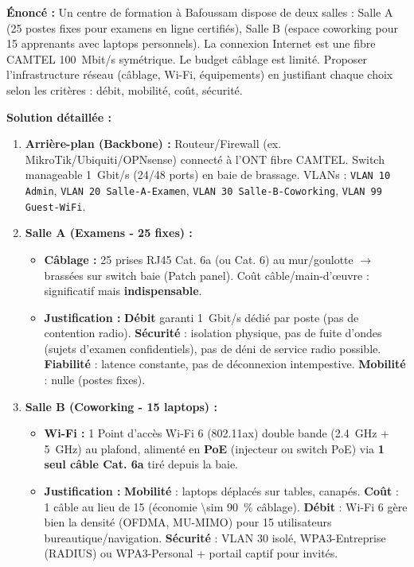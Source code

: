 \documentclass[11pt]{article}
\begin{document}
\begin{exoresolu}
\textbf{Énoncé :} Un centre de formation à Bafoussam dispose de deux salles : Salle A (25 postes fixes pour examens en ligne certifiés), Salle B (espace coworking pour 15 apprenants avec laptops personnels). La connexion Internet est une fibre CAMTEL \SI{100}{Mbit/s} symétrique. Le budget câblage est limité. Proposer l'infrastructure réseau (câblage, Wi-Fi, équipements) en justifiant chaque choix selon les critères : débit, mobilité, coût, sécurité.

\textbf{Solution détaillée :}

\begin{enumerate}
    \item \textbf{Arrière-plan (Backbone) :} Routeur/Firewall (ex. MikroTik/Ubiquiti/OPNsense) connecté à l'ONT fibre CAMTEL. Switch manageable \SI{1}{Gbit/s} (24/48 ports) en baie de brassage. VLANs : \texttt{VLAN 10 Admin}, \texttt{VLAN 20 Salle-A-Examen}, \texttt{VLAN 30 Salle-B-Coworking}, \texttt{VLAN 99 Guest-WiFi}.
    \item \textbf{Salle A (Examens - 25 fixes) :}
        \begin{itemize}
            \item \textbf{Câblage :} 25 prises RJ45 Cat. 6a (ou Cat. 6) au mur/goulotte $\to$ brassées sur switch baie (Patch panel). Coût câble/main-d'œuvre : significatif mais \textbf{indispensable}.
            \item \textbf{Justification :} \textbf{Débit} garanti \SI{1}{Gbit/s} dédié par poste (pas de contention radio). \textbf{Sécurité} : isolation physique, pas de fuite d'ondes (sujets d'examen confidentiels), pas de déni de service radio possible. \textbf{Fiabilité} : latence constante, pas de déconnexion intempestive. \textbf{Mobilité} : nulle (postes fixes).
        \end{itemize}
    \item \textbf{Salle B (Coworking - 15 laptops) :}
        \begin{itemize}
            \item \textbf{Wi-Fi :} 1 Point d'accès Wi-Fi 6 (802.11ax) double bande (\SI{2,4}{GHz} + \SI{5}{GHz}) au plafond, alimenté en \textbf{PoE} (injecteur ou switch PoE) via \textbf{1 seul câble Cat. 6a} tiré depuis la baie.
            \item \textbf{Justification :} \textbf{Mobilité} : laptops déplacés sur tables, canapés. \textbf{Coût} : 1 câble au lieu de 15 (économie \SI{\sim 90}{\%} câblage). \textbf{Débit} : Wi-Fi 6 gère bien la densité (OFDMA, MU-MIMO) pour 15 utilisateurs bureautique/navigation. \textbf{Sécurité} : VLAN 30 isolé, WPA3-Entreprise (RADIUS) ou WPA3-Personal + portail captif pour invités.

\end{itemize}
\end{enumerate}
\end{exoresolu}
\end{document}
